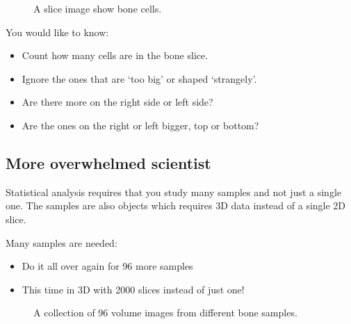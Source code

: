 \documentclass[letterpaper,10pt,english]{sphinxmanual}
\begin{document}
\begin{figure}[htbp]
\centering
\capstart

\noindent{}
\caption{A slice image show bone cells.}\label{\detokenize{01-Introduction:id10}}\end{figure}

\sphinxAtStartPar
You would like to know:
\begin{itemize}
\item {} 
\sphinxAtStartPar
Count how many cells are in the bone slice.

\item {} 
\sphinxAtStartPar
Ignore the ones that are ‘too big’ or shaped ‘strangely’.

\item {} 
\sphinxAtStartPar
Are there more on the right side or left side?

\item {} 
\sphinxAtStartPar
Are the ones on the right or left bigger, top or bottom?

\end{itemize}




\subsection{More overwhelmed scientist}
\label{\detokenize{01-Introduction:more-overwhelmed-scientist}}
\sphinxAtStartPar
Statistical analysis requires that you study many samples and not just a single one. The samples are also objects which requires 3D data instead of a single 2D slice.

\sphinxAtStartPar
Many samples are needed:
\begin{itemize}
\item {} 
\sphinxAtStartPar
Do it all over again for 96 more samples

\item {} 
\sphinxAtStartPar
This time in 3D with 2000 slices instead of just one!

\end{itemize}



\begin{figure}[htbp]
\centering
\capstart

\noindent{}
\caption{A collection of 96 volume images from different bone samples.}\label{\detokenize{01-Introduction:id11}}\end{figure}
\end{document}
